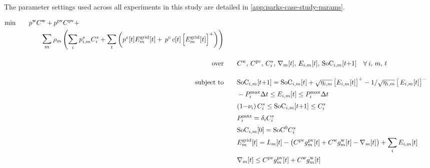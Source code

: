 The parameter settings used across all experiments in this study are detailed in \ref{app:parks-case-study-params}.

\renewcommand{\arraystretch}{1}
\begin{subequations} \label{eq:parks-SP-formualtion}
    \begin{align}
        \addtocounter{equation}{-1}
        \begin{split}
        \text{min} & \qquad p^{\textrm{w}} C^{\textrm{w}} + p^{\textrm{pv}} C^{\textrm{pv}} + \\[\smalleqnskip]
        & \qquad\qquad \mathlarger{\mathlarger{\sum}}_m \: \rho_m \left( \mathlarger{\sum}_i \: p^s_{i,m} C^s_i + \mathlarger{\sum}_t \left( p^e[t] E^{\text{grid}}_m[t] + \, p^c \, c[t] \left[E^{\text{grid}}_m[t]\right]^+ \right) \right)
        \end{split} \label{eq:parks-lp} \\[\eqnskip]%
        \text{over} & \qquad C^{\textrm{w}},\, C^{\textrm{pv}},\, C^s_i,\, \nabla_m[t],\,  E_{i,m}[t],\, \textrm{SoC}_{i,m}[t{+}1] \quad \forall \: i,\, m,\, t \tag*{} \\[\eqnskip]%
        \text{subject to} & \qquad \textrm{SoC}_{i,m}[t{+}1] = \textrm{SoC}_{i,m}[t] + \sqrt{\eta_{i,m}} \left[E_{i,m}[t]\right]^{+} - 1/\sqrt{\eta_{i,m}} \left[\, E_{i,m}[t] \right]^{-} \label{eq:parks-dynamics-constraint} \\[\smalleqnskip]
        & \qquad -P^{\textrm{max}}_i \Delta t \leq E_{i,m}[t] \leq P^{\textrm{max}}_i \Delta t \label{eq:parks-power-constraint} \\[\smalleqnskip]
        & \qquad (1{-}\nu_i)\, C^s_i \leq \textrm{SoC}_{i,m}[t{+}1] \leq C^s_i \label{eq:parks-energy-constraint} \\[\smalleqnskip]
        & \qquad P^{\textrm{max}}_i = \delta_i C^s_i \label{eq:parks-power-capacity} \\[\smalleqnskip]
        & \qquad \textrm{SoC}_{i,m}[0] = \textrm{SoC}^0 C^s_i \label{eq:parks-initial-conditions} \\[\smalleqnskip]
        & \qquad E^{\text{grid}}_m[t] = L_{m}[t] - \left(C^{\textrm{pv}} g_m^{\textrm{pv}}[t] + C^{\textrm{w}} g_m^{\textrm{w}}[t] - \nabla_m[t] \right) + \sum_i E_{i,m}[t] \label{eq:parks-grid-variable} \\[\smalleqnskip]
        & \qquad \nabla_m[t] \leq C^{\textrm{pv}} g_m^{\textrm{pv}}[t] + C^{\textrm{w}} g_m^{\textrm{w}}[t] \label{eq:parks-curtailment} \\[\smalleqnskip]

\end{align}
\end{subequations}
